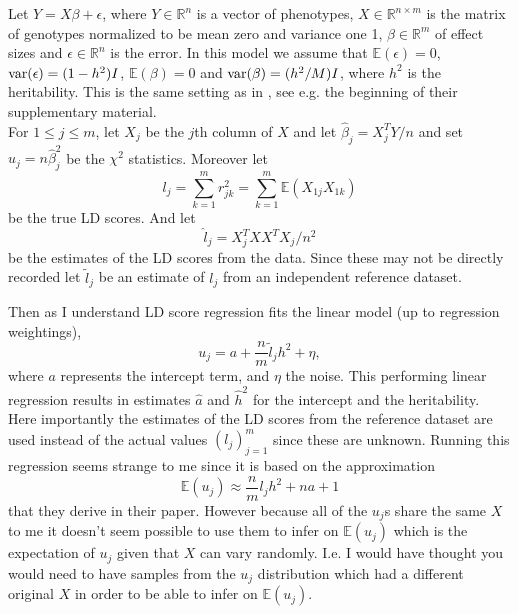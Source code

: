 Let $ Y = X\beta + \epsilon$, where $ Y \in \mathbb{R}^n$ is a vector of phenotypes, $ X \in \mathbb{R}^{n\times m}$ is the matrix of genotypes normalized to be mean zero and variance one 1, $ \beta \in \mathbb{R}^m$ of effect sizes and $ \epsilon \in \mathbb{R}^n$ is the error. In this model we assume that $ \mathbb{E}(\epsilon) = 0  $, $ \text{var}(\epsilon) = (1-h^2)I $, $ \mathbb{E}(\beta)  = 0$ and $  \text{var}(\beta) = (h^2/M)I $, where $ h^2 $ is the heritability. This is the same setting as in  \cite{Bulik2015}, see e.g. the beginning of their supplementary material.\\

\noindent For $ 1\leq j \leq m $, let $ X_j $ be the $ j $th column of $ X $ and let $ \hat{\beta}_j = X_j^TY/n $ and set $ u_j = n\hat{\beta}_j^2 $ be the $ \chi^2 $ statistics. Moreover let
\begin{equation*}
	l_j = \sum_{k = 1}^m r^2_{jk}  = \sum_{k = 1}^m \mathbb{E}(X_{1j}X_{1k})
\end{equation*}
be the true LD scores. And let 
\begin{equation*}
	\hat{l}_j = X_j^TXX^TX_j/n^2 
\end{equation*}
be the estimates of the LD scores from the data. Since these may not be directly recorded let $ \tilde{l}_j $ be an estimate of $ l_j $ from an independent reference dataset. 

Then as I understand LD score regression fits the linear model (up to regression weightings),
\begin{equation*}
	u_j = a + \frac{n}{m}\tilde{l}_j h^2 + \eta,
\end{equation*}
where $ a $ represents the intercept term, and $ \eta $ the noise. This performing linear regression results in estimates $ \hat{a} $ and $ \hat{h}^2$ for the intercept and the heritability. Here importantly the estimates of the LD scores from the reference dataset are used instead of the actual values $ (l_j)_{j = 1}^m $ since these are unknown. Running this regression seems strange to me since it is based on the approximation
\begin{equation*}
	\mathbb{E}(u_j) \approx\frac{n}{m}l_j h^2 + na + 1
\end{equation*}
that they derive in their paper. However because all of the $ u_j $s share the same $ X $ to me it doesn't seem possible to use them to infer on $ \mathbb{E}(u_j) $ which is the expectation of $ u_j $ given that $ X $ can vary randomly. I.e. I would have thought you would need to have samples from the $ u_j $ distribution which had a different original $ X $ in order to be able to infer on $ \mathbb{E}(u_j) $.

